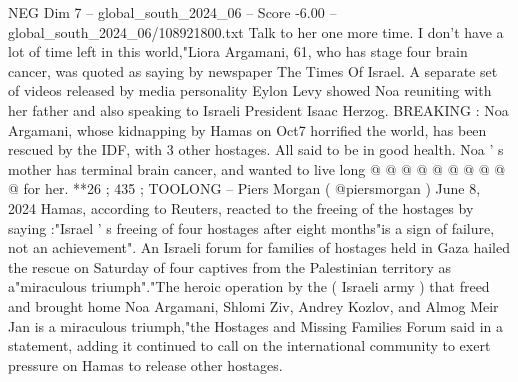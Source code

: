 \begin{textsample}{NEG Dim 7 – global\_south\_2024\_06 – Score -6.00 – global\_south\_2024\_06/108921800.txt}
Talk to her one more time.
I don't have a lot of time left in this world,"Liora Argamani, 61, who has stage four brain cancer, was quoted as saying by newspaper The Times Of Israel.
A separate set of videos released by media personality Eylon Levy showed Noa reuniting with her father and also speaking to Israeli President Isaac Herzog.
BREAKING : Noa Argamani, whose kidnapping by Hamas on Oct7 horrified the world, has been rescued by the IDF, with 3 other hostages.
All said to be in good health.
Noa ' s mother has terminal brain cancer, and wanted to live long @ @ @ @ @ @ @ @ @ @ for her. **26 ; 435 ; TOOLONG -- Piers Morgan ( @piersmorgan ) June 8, 2024 Hamas, according to Reuters, reacted to the freeing of the hostages by saying :"Israel ' s freeing of four hostages after eight months"is a sign of failure, not an achievement".
An Israeli forum for families of hostages held in Gaza hailed the rescue on Saturday of four captives from the Palestinian territory as a"miraculous triumph"."The heroic operation by the ( Israeli army ) that freed and brought home Noa Argamani, Shlomi Ziv, Andrey Kozlov, and Almog Meir Jan is a miraculous triumph,"the Hostages and Missing Families Forum said in a statement, adding it continued to call on the international community to exert pressure on Hamas to release other hostages.

\end{textsample}
